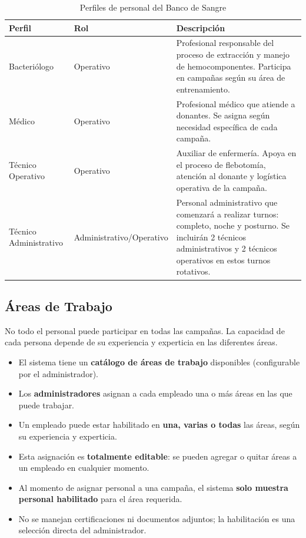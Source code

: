 \documentclass[10pt,a4paper]{article}
\begin{document}
\begin{table}[h!]
\centering
\begin{tabularx}{\textwidth}{|l|l|X|}
\hline
\textbf{Perfil} & \textbf{Rol} & \textbf{Descripci\'{o}n} \\
\hline
Bacteri\'{o}logo & Operativo & Profesional responsable del proceso de extracci\'{o}n y manejo de hemocomponentes. Participa en campañas seg\'{u}n su \'{a}rea de entrenamiento. \\
\hline
M\'{e}dico & Operativo & Profesional m\'{e}dico que atiende a donantes. Se asigna seg\'{u}n necesidad espec\'{i}fica de cada campaña. \\
\hline
T\'{e}cnico Operativo & Operativo & Auxiliar de enfermer\'{i}a. Apoya en el proceso de flebotom\'{i}a, atenci\'{o}n al donante y log\'{i}stica operativa de la campaña. \\
\hline
T\'{e}cnico Administrativo & Administrativo/Operativo & Personal administrativo que comenzar\'{a} a realizar turnos: completo, noche y posturno. Se incluir\'{a}n 2 t\'{e}cnicos administrativos y 2 t\'{e}cnicos operativos en estos turnos rotativos. \\
\hline
\end{tabularx}
\caption{Perfiles de personal del Banco de Sangre}
\end{table}

\subsection{\'{A}reas de Trabajo}

No todo el personal puede participar en todas las campañas. La capacidad de cada persona depende de su experiencia y experticia en las diferentes \'{a}reas.

\begin{itemize}[leftmargin=2em]
    \item El sistema tiene un \textbf{cat\'{a}logo de \'{a}reas de trabajo} disponibles (configurable por el administrador).
    \item Los \textbf{administradores} asignan a cada empleado una o m\'{a}s \'{a}reas en las que puede trabajar.
    \item Un empleado puede estar habilitado en \textbf{una, varias o todas} las \'{a}reas, seg\'{u}n su experiencia y experticia.
    \item Esta asignaci\'{o}n es \textbf{totalmente editable}: se pueden agregar o quitar \'{a}reas a un empleado en cualquier momento.
    \item Al momento de asignar personal a una campaña, el sistema \textbf{solo muestra personal habilitado} para el \'{a}rea requerida.
    \item No se manejan certificaciones ni documentos adjuntos; la habilitaci\'{o}n es una selecci\'{o}n directa del administrador.
\end{itemize}
\end{document}
